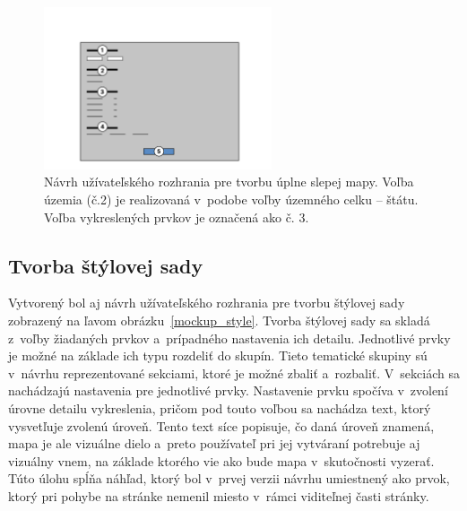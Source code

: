 \begin{figure}[hbt]
	\centering
	\includegraphics[width=0.6\textwidth]{obrazky-figures/prototype_blind.pdf}
	\caption{Návrh užívateľského rozhrania pre tvorbu úplne slepej mapy. Voľba územia (č.2) je realizovaná v~podobe voľby územného celku -- štátu. Voľba vykreslených prvkov je označená ako č. 3.}
	\label{mockup_blind}
\end{figure}


\subsection*{Tvorba štýlovej sady}
Vytvorený bol aj návrh užívateľského rozhrania pre tvorbu štýlovej sady zobrazený na ľavom obrázku~\ref{mockup_style}. Tvorba štýlovej sady sa skladá z~voľby žiadaných prvkov a~prípadného nastavenia ich detailu. Jednotlivé prvky je možné na základe ich typu rozdeliť do skupín. Tieto tematické skupiny sú v~návrhu reprezentované sekciami, ktoré je možné zbaliť a~rozbaliť. V~sekciách sa nachádzajú nastavenia pre jednotlivé prvky. Nastavenie prvku spočíva v~zvolení úrovne detailu vykreslenia, pričom pod touto voľbou sa nachádza text, ktorý vysvetľuje zvolenú úroveň. Tento text síce popisuje, čo daná úroveň znamená, mapa je ale vizuálne dielo a~preto používateľ pri jej vytváraní potrebuje aj vizuálny vnem, na základe ktorého vie ako bude mapa v~skutočnosti vyzerať. Túto úlohu spĺňa náhľad, ktorý bol v~prvej verzii návrhu umiestnený ako  prvok, ktorý pri pohybe na stránke nemenil miesto v~rámci viditeľnej časti stránky.

